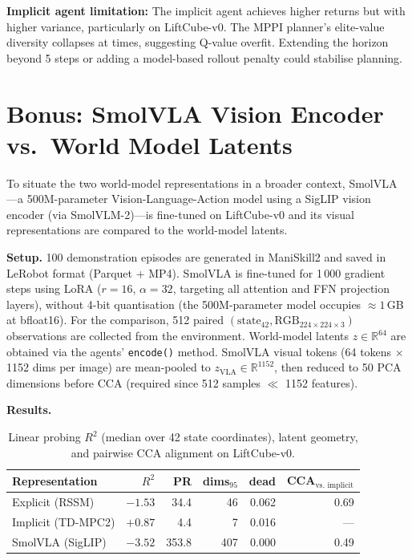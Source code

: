 \documentclass{article}
\begin{document}
\textbf{Implicit agent limitation:} The implicit agent achieves higher returns but with
higher variance, particularly on LiftCube-v0.
The MPPI planner's elite-value diversity collapses at times, suggesting Q-value overfit.
Extending the horizon beyond 5 steps or adding a model-based rollout penalty could
stabilise planning.

\section{Bonus: SmolVLA Vision Encoder vs.\ World Model Latents}
\label{sec:smolvla}

To situate the two world-model representations in a broader context, SmolVLA
\citep{smolvla2025}—a 500M-parameter Vision-Language-Action model using a
SigLIP vision encoder (via SmolVLM-2)—is fine-tuned on LiftCube-v0 and its
visual representations are compared to the world-model latents.

\textbf{Setup.}
100 demonstration episodes are generated in ManiSkill2 and saved in LeRobot
format (Parquet + MP4).
SmolVLA is fine-tuned for 1\,000 gradient steps using LoRA
($r{=}16$, $\alpha{=}32$, targeting all attention and FFN projection layers),
without 4-bit quantisation (the 500M-parameter model occupies ${\approx}1$\,GB
at bfloat16).
For the comparison, 512 paired $(\text{state}_{42}, \text{RGB}_{224\times224\times3})$
observations are collected from the environment.
World-model latents $z \in \mathbb{R}^{64}$ are obtained via the agents'
\texttt{encode()} method.
SmolVLA visual tokens (64 tokens $\times$ 1152 dims per image) are mean-pooled
to $z_\text{VLA} \in \mathbb{R}^{1152}$, then reduced to 50 PCA dimensions
before CCA (required since 512 samples $\ll$ 1152 features).

\textbf{Results.}

\begin{table}[h]
\centering
\small
\caption{Linear probing $R^2$ (median over 42 state coordinates), latent geometry,
         and pairwise CCA alignment on LiftCube-v0.}
\label{tab:smolvla}
\begin{tabular}{lrrrrr}
\toprule
Representation & $R^2$ & PR & dims$_{95}$ & dead & CCA$_\text{vs.\ implicit}$ \\
\midrule
Explicit (RSSM)     & $-1.53$ & 34.4 & 46  & 0.062 & 0.69 \\
Implicit (TD-MPC2)  & $+0.87$ &  4.4 &  7  & 0.016 & —    \\
SmolVLA (SigLIP)    & $-3.52$ & 353.8 & 407 & 0.000 & 0.49 \\
\bottomrule
\end{tabular}
\end{table}
\end{document}
